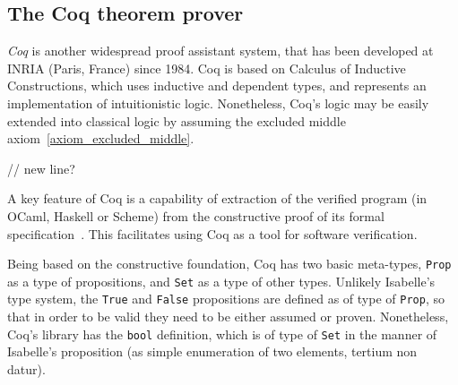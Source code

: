 \documentclass[article]{aaltoseries}
\begin{document}



\subsection{The Coq theorem prover}
\label{sec:prover_coq}

\textit{Coq} is another widespread proof assistant system, that has been developed at INRIA (Paris, France) since 1984. Coq is based on Calculus of Inductive Constructions, which uses inductive and dependent types, and represents an implementation of intuitionistic logic. Nonetheless, Coq's logic may be easily extended into classical logic by assuming the excluded middle axiom~\ref{axiom_excluded_middle}. 

// new line?

A key feature of Coq is a capability of extraction of the verified program (in OCaml, Haskell or Scheme) from the constructive proof of its formal specification~\cite{Letouzey08}. This facilitates using Coq as a tool for software verification.

Being based on the constructive foundation, Coq has two basic meta-types, \texttt{Prop} as a type of propositions, and \texttt{Set} as a type of other types.
Unlikely Isabelle's type system, the \texttt{True} and \texttt{False} propositions are defined as of type of \texttt{Prop}, so that in order to be valid they need to be either assumed or proven. Nonetheless, Coq's library has the \texttt{bool} definition, which is of type of \texttt{Set} in the manner of Isabelle's proposition (as simple enumeration of two elements, tertium non datur).
\end{document}

